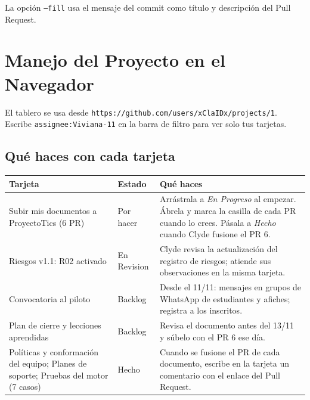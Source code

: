 \documentclass[11pt,a4paper]{article}
\begin{document}
\noindent La opción \texttt{--fill} usa el mensaje del commit como título y descripción del Pull Request.

\section{Manejo del Proyecto en el Navegador}
El tablero se usa desde \nolinkurl{https://github.com/users/xClaIDx/projects/1}. Escribe \nolinkurl{assignee:Viviana-11} en la barra de filtro para ver solo tus tarjetas.

\subsection{Qué haces con cada tarjeta}
{\small
{}
\noindent\begin{tabularx}{\textwidth}{@{}P{4.4cm} C{1.9cm} L@{}}
\toprule
{}
\textbf{Tarjeta} & \textbf{Estado} & \textbf{Qué haces} \\
\midrule
Subir mis documentos a ProyectoTics (6 PR) & Por hacer & Arrástrala a \textit{En Progreso} al empezar. Ábrela y marca la casilla de cada PR cuando lo crees. Pásala a \textit{Hecho} cuando Clyde fusione el PR 6. \\
Riesgos v1.1: R02 activado & En Revision & Clyde revisa la actualización del registro de riesgos; atiende sus observaciones en la misma tarjeta. \\
Convocatoria al piloto & Backlog & Desde el 11/11: mensajes en grupos de WhatsApp de estudiantes y afiches; registra a los inscritos. \\
Plan de cierre y lecciones aprendidas & Backlog & Revisa el documento antes del 13/11 y súbelo con el PR 6 ese día. \\
Políticas y conformación del equipo; Planes de soporte; Pruebas del motor (7 casos) & Hecho & Cuando se fusione el PR de cada documento, escribe en la tarjeta un comentario con el enlace del Pull Request. \\
\bottomrule
\end{tabularx}
}


\end{document}
